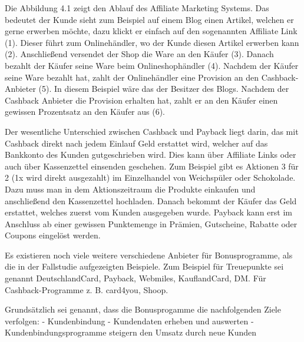     Die Abbildung 4.1 zeigt den Ablauf des Affiliate Marketing Systems. Das bedeutet der Kunde sieht zum Beispiel auf einem Blog einen Artikel, welchen er gerne erwerben möchte, dazu klickt er einfach auf den sogenannten Affiliate Link (1). Dieser führt zum Onlinehändler, wo der Kunde diesen Artikel erwerben kann (2). Anschließend versendet der Shop die Ware an den Käufer (3). Danach bezahlt der Käufer seine Ware beim Onlineshophändler (4). Nachdem der Käufer seine Ware bezahlt hat, zahlt der Onlinehändler eine Provision an den Cashback-Anbieter (5). In diesem Beispiel wäre das der Besitzer des Blogs. Nachdem der Cashback Anbieter die Provision erhalten hat, zahlt er an den Käufer einen gewissen Prozentsatz an den Käufer aus (6). \cite{Bonus_affiliate} \newline

    \noindent Der wesentliche Unterschied zwischen Cashback und Payback liegt darin, das mit Cashback direkt nach jedem Einlauf Geld erstattet wird, welcher auf das Bankkonto des Kunden gutgeschrieben wird. Dies kann über Affiliate Links oder auch über Kassenzettel einsenden geschehen. Zum Beispiel gibt es Aktionen 3 für 2 (1x wird direkt ausgezahlt) im Einzelhandel von Weichspüler oder Schokolade. Dazu muss man in dem Aktionszeitraum die Produkte einkaufen und anschließend den Kassenzettel hochladen. Danach bekommt der Käufer das Geld erstattet, welches zuerst vom Kunden ausgegeben wurde. Payback kann erst im Anschluss ab einer gewissen Punktemenge in Prämien, Gutscheine, Rabatte oder Coupons eingelöst werden. \cite{TreueCash} \newline
    
    \noindent Es existieren noch viele weitere verschiedene Anbieter für Bonusprogramme, als die in der Fallstudie aufgezeigten Beispiele. Zum Beispiel für Treuepunkte sei genannt DeutschlandCard, Payback, Webmiles, KauflandCard, DM. Für Cashback-Programme z. B. card4you, Shoop. \newline

    \noindent Grundsätzlich sei genannt, dass die Bonusprogamme die nachfolgenden Ziele verfolgen:\newline
    - Kundenbindung \newline
    - Kundendaten erheben und auswerten \newline
    - Kundenbindungsprogramme steigern den Umsatz durch neue Kunden \cite{paycashback_all} 
